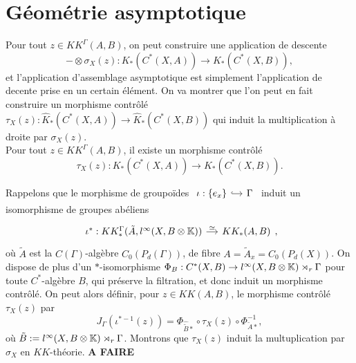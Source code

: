 \section{Géométrie asymptotique}

Pour tout $z\in KK^\Gamma(A,B)$, on peut construire une application de descente \[-\otimes\sigma_X (z) : K_*(C^*(X,A))\rightarrow K_*(C^*(X,B)), \]
et l'application d'assemblage asymptotique est simplement l'application de decente prise en un certain élément. On va montrer que l'on peut en fait construire un morphisme contrôlé $\tau_X(z) : \hat K_*(C^*(X,A))\rightarrow \hat K_*(C^*(X,B))$ qui induit la multiplication à droite par $\sigma_X(z)$.\\

Pour tout $z\in KK^\Gamma(A,B)$, il existe un morphisme contrôlé \[\tau_X (z) : K_*(C^*(X,A))\rightarrow K_*(C^*(X,B)). \]

Rappelons que le morphisme de groupoïdes $\begin{tikzcd}[column sep = small]\iota : \{e_x\}\arrow[hook]{r} & \Gamma\end{tikzcd}$ induit un isomorphisme de groupes abéliens 
\[\begin{tikzcd}[column sep = small] \iota^* : KK_*^\Gamma(\tilde A, l^\infty(X,B\otimes\K))\arrow{r}{\simeq} & KK_*(A,B)\end{tikzcd},\]
où $\tilde A$ est la $C(\Gamma)$-algèbre $C_0(P_d(\Gamma))$, de fibre $A= \tilde A_x = C_0(P_d(X))$.
On dispose de plus d'un $*$-isomorphisme $\Phi_B : C^* (X,B)\rightarrow l^\infty(X,B\otimes \mathbb K)\rtimes_r \Gamma$ pour toute $C^*$-algèbre $B$, qui préserve la filtration, et donc induit un morphisme contrôlé. On peut alors définir, pour $z\in KK(A,B)$, le morphisme contrôlé $\tau_X(z)$ par 
\[J_\Gamma(\iota^{*-1}(z)) = \Phi_{\hat \tilde B *} \circ \tau_X (z) \circ \Phi_{\tilde A *}^{-1},\]
où $\tilde B := l^\infty(X,B \otimes \mathbb K)\rtimes_r \Gamma$. Montrons que $\tau_X(z)$ induit la multuplication par $\sigma_X$ en $KK$-théorie. \textbf{A FAIRE}
